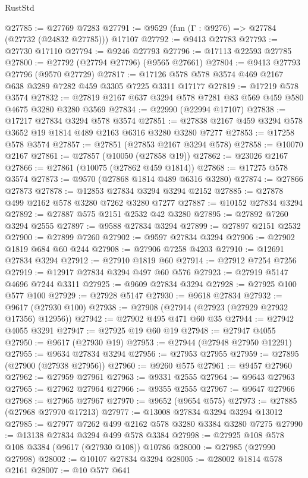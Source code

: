 \begin{lexlean}{RustStd}
\begin{coremodule}
@27785 := @27769 @7283
@27791 := @9529 (fun (Γ : @9276) => @27784 (@27732 (@24832 @27785))) @17107
@27792 := @9413 @27783
@27793 := @27730 @17110
@27794 := @9246 @27793
@27796 := @17113 @22593 @27785
@27800 := @27792 (@27794 @27796) (@9565 @27661)
@27804 := @9413 @27793 @27796 (@9570 @27729)
@27817 := @17126 @578 @578 @3574 @469 @2167 @638 @3289 @7282 @459 @3305 @7225 @3311 @17177
@27819 := @17219 @578 @3574
@27832 := @27819 @2167 @637 @3294 @578 @7281 @83 @569 @459 @580 @4675 @3280 @3280 @3569
@27834 := @22990 (@22994 @17107)
@27838 := @17217 @27834 @3294 @578 @3574
@27851 := @27838 @2167 @459 @3294 @578 @3652 @19 @1814 @489 @2163 @6316 @3280 @3280 @7277
@27853 := @17258 @578 @3574
@27857 := @27851 (@27853 @2167 @3294 @578)
@27858 := @10070 @2167
@27861 := @27857 (@10050 (@27858 @19))
@27862 := @23026 @2167
@27866 := @27861 (@10075 (@27862 @459 @1814))
@27868 := @17275 @578 @3574
@27873 := @9570 (@27868 @1814 @489 @6316 @3280)
@27874 := @27866 @27873
@27878 := @12853 @27834 @3294 @3294 @2152
@27885 := @27878 @499 @2162 @578 @3280 @7262 @3280 @7277
@27887 := @10152 @27834 @3294
@27892 := @27887 @575 @2151 @2532 @42 @3280
@27895 := @27892 @7260 @3294 @2555
@27897 := @9588 @27834 @3294
@27899 := @27897 @2151 @2532
@27900 := @27899 @7260
@27902 := @9597 @27834 @3294
@27906 := @27902 @1819 @684 @60 @244
@27908 := @27906 @7258 @4203
@27910 := @12691 @27834 @3294
@27912 := @27910 @1819 @60
@27914 := @27912 @7254 @7256
@27919 := @12917 @27834 @3294 @497 @60 @576
@27923 := @27919 @5147 @4696 @7244 @3311
@27925 := @9609 @27834 @3294
@27928 := @27925 @100 @577 @100
@27929 := @27928 @5147
@27930 := @9618 @27834
@27932 := @9617 (@27930 @100)
@27938 := @27908 (@27914 (@27923 (@27929 @27932 @17356) @12956))
@27942 := @27902 @495 @471 @60 @35
@27944 := @27942 @4055 @3291
@27947 := @27925 @19 @60 @19
@27948 := @27947 @4055
@27950 := @9617 (@27930 @19)
@27953 := @27944 (@27948 @27950 @12291)
@27955 := @9634 @27834 @3294
@27956 := @27953 @27955
@27959 := @27895 (@27900 (@27938 @27956))
@27960 := @9260 @575
@27961 := @9457 @27960
@27962 := @27959 @27961
@27963 := @9331 @2555
@27964 := @9643 @27963
@27965 := @27962 @27964
@27966 := @9355 @2555
@27967 := @9647 @27966
@27968 := @27965 @27967
@27970 := @9652 (@9654 @575)
@27973 := @27885 (@27968 @27970 @17213)
@27977 := @13008 @27834 @3294 @3294 @13012
@27985 := @27977 @7262 @499 @2162 @578 @3280 @3384 @3280 @7275
@27990 := @13138 @27834 @3294 @499 @578 @3384
@27998 := @27925 @108 @578 @108 @3384 (@9617 (@27930 @108)) @10786
@28000 := @27985 (@27990 @27998)
@28002 := @10107 @27834 @3294
@28005 := @28002 @1814 @578 @2161
@28007 := @10 @577 @641

\end{coremodule}
\end{lexlean}

